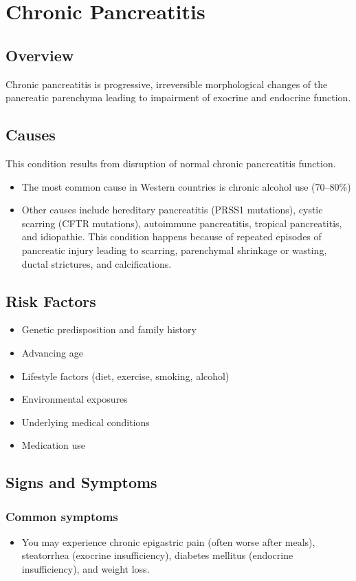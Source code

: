 \chapter{Chronic Pancreatitis}
\label{sec:Chronic Pancreatitis}

\section{Overview}
Chronic pancreatitis is progressive, irreversible morphological changes of the pancreatic parenchyma leading to impairment of exocrine and endocrine function.
\section{Causes}
This condition results from disruption of normal chronic pancreatitis function.

\begin{itemize}[noitemsep]
  \item The most common cause in Western countries is chronic alcohol use (70--80\%)
  \item Other causes include hereditary pancreatitis (PRSS1 mutations), cystic scarring (CFTR mutations), autoimmune pancreatitis, tropical pancreatitis, and idiopathic. This condition happens because of repeated episodes of pancreatic injury leading to scarring, parenchymal shrinkage or wasting, ductal strictures, and calcifications.
\end{itemize}
\section{Risk Factors}


\begin{itemize}[noitemsep]
  \item Genetic predisposition and family history
  \item Advancing age
  \item Lifestyle factors (diet, exercise, smoking, alcohol)
  \item Environmental exposures
  \item Underlying medical conditions
  \item Medication use
\end{itemize}
\section{Signs and Symptoms}

\subsection{Common symptoms}
\begin{itemize}[noitemsep]
  \item You may experience chronic epigastric pain (often worse after meals), steatorrhea (exocrine insufficiency), diabetes mellitus (endocrine insufficiency), and weight loss. 
  \end{itemize}

